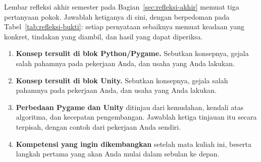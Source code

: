 \begin{refleksibox}
Lembar refleksi akhir semester pada Bagian~\ref{sec:refleksi-akhir} memuat
tiga pertanyaan pokok. Jawablah ketiganya di sini, dengan berpedoman pada
Tabel~\ref{tab:refleksi-bukti}: setiap pernyataan sebaiknya memuat keadaan
yang konkret, tindakan yang diambil, dan hasil yang dapat diperiksa.

\begin{enumerate}
  \item \textbf{Konsep tersulit di blok Python/Pygame.} Sebutkan konsepnya,
        gejala salah pahamnya pada pekerjaan Anda, dan usaha yang Anda
        lakukan.

  \item \textbf{Konsep tersulit di blok Unity.} Sebutkan konsepnya, gejala
        salah pahamnya pada pekerjaan Anda, dan usaha yang Anda lakukan.

  \item \textbf{Perbedaan Pygame dan Unity} ditinjau dari kemudahan, kendali
        atas algoritma, dan kecepatan pengembangan. Jawablah ketiga tinjauan
        itu secara terpisah, dengan contoh dari pekerjaan Anda sendiri.

  \item \textbf{Kompetensi yang ingin dikembangkan} setelah mata kuliah ini,
        beserta langkah pertama yang akan Anda mulai dalam sebulan ke depan.
\end{enumerate}
\end{refleksibox}
